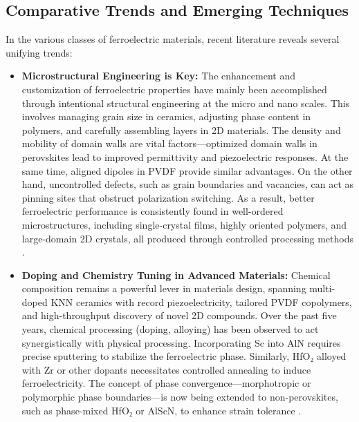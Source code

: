 \documentclass[a4paper,fleqn]{cas-sc}
\begin{document}
\subsection*{Comparative Trends and Emerging Techniques}
\par In the various classes of ferroelectric materials, recent literature reveals several unifying trends:
\begin{itemize}

    \item \textbf{Microstructural Engineering is Key:} The enhancement and customization of ferroelectric properties have mainly been accomplished through intentional structural engineering at the micro and nano scales. This involves managing grain size in ceramics, adjusting phase content in polymers, and carefully assembling layers in 2D materials. The density and mobility of domain walls are vital factors—optimized domain walls in perovskites lead to improved permittivity and piezoelectric responses. At the same time, aligned dipoles in PVDF provide similar advantages. On the other hand, uncontrolled defects, such as grain boundaries and vacancies, can act as pinning sites that obstruct polarization switching. As a result, better ferroelectric performance is consistently found in well-ordered microstructures, including single-crystal films, highly oriented polymers, and large-domain 2D crystals, all produced through controlled processing methods \cite{ahbab2025comprehensive,tan2015unfolding}.
    
    \item \textbf{Doping and Chemistry Tuning in Advanced Materials:} Chemical composition remains a powerful lever in materials design, spanning multi-doped KNN ceramics with record piezoelectricity, tailored PVDF copolymers, and high-throughput discovery of novel 2D compounds. Over the past five years, chemical processing (doping, alloying) has been observed to act synergistically with physical processing. Incorporating Sc into AlN requires precise sputtering to stabilize the ferroelectric phase. Similarly, HfO₂ alloyed with Zr or other dopants necessitates controlled annealing to induce ferroelectricity. The concept of phase convergence—morphotropic or polymorphic phase boundaries—is now being extended to non-perovskites, such as phase-mixed HfO₂ or AlScN, to enhance strain tolerance \cite{zhu2025ultrahigh,kruse2023two}.  
    

\end{itemize}
\end{document}
